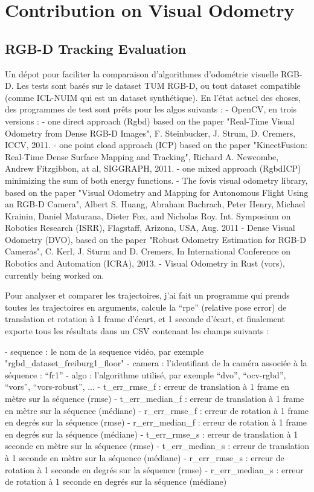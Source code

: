 \chapter{Contribution on Visual Odometry}%
\label{cha:vors}

\minitoc%

\section{RGB-D Tracking Evaluation}%
\label{sec:rgbd-tracking-evaluation}

Un dépot pour faciliter la comparaison d’algorithmes d’odométrie visuelle RGB-D. Les tests sont basés sur le dataset TUM RGB-D, ou tout dataset compatible (comme ICL-NUIM qui est un dataset synthétique). En l’état actuel des choses, des programmes de test sont prêts pour les algos suivants :
- OpenCV, en trois versions :
  - one direct approach (Rgbd) based on the paper "Real-Time Visual Odometry from Dense RGB-D Images", F. Steinbucker, J. Strum, D. Cremers, ICCV, 2011.
  - one point cload approach (ICP) based on the paper "KinectFusion: Real-Time Dense Surface Mapping and Tracking", Richard A. Newcombe, Andrew Fitzgibbon, at al, SIGGRAPH, 2011.
  - one mixed approach (RgbdICP) minimizing the sum of both energy functions.
- The fovis visual odometry library, based on the paper "Visual Odometry and Mapping for Autonomous Flight Using an RGB-D Camera", Albert S. Huang, Abraham Bachrach, Peter Henry, Michael Krainin, Daniel Maturana, Dieter Fox, and Nicholas Roy. Int. Symposium on Robotics Research (ISRR), Flagstaff, Arizona, USA, Aug. 2011
- Dense Visual Odometry (DVO), based on the paper "Robust Odometry Estimation for RGB-D Cameras", C. Kerl, J. Sturm and D. Cremers, In International Conference on Robotics and Automation (ICRA), 2013.
- Visual Odometry in Rust (vors), currently being worked on.

Pour analyser et comparer les trajectoires, j’ai fait un programme qui prends toutes les trajectoires en arguments, calcule la “rpe” (relative pose error) de translation et rotation à 1 frame d’écart, et 1 seconde d’écart, et finalement exporte tous les résultats dans un CSV contenant les champs suivants :

- sequence : le nom de la sequence vidéo, par exemple "rgbd\_dataset\_freiburg1\_floor"
- camera : l’identifiant de la caméra associée à la séquence : “fr1”
- algo : l’algorithme utilisé, par exemple “dvo”, “ocv-rgbd”, “vors”, “vors-robust”, ...
- t\_err\_rmse\_f : erreur de translation à 1 frame en mètre sur la séquence (rmse)
- t\_err\_median\_f : erreur de translation à 1 frame en mètre sur la séquence (médiane)
- r\_err\_rmse\_f : erreur de rotation à 1 frame en degrés sur la séquence (rmse)
- r\_err\_median\_f : erreur de rotation à 1 frame en degrés sur la séquence (médiane)
- t\_err\_rmse\_s : erreur de translation à 1 seconde en mètre sur la séquence (rmse)
- t\_err\_median\_s : erreur de translation à 1 seconde en mètre sur la séquence (médiane)
- r\_err\_rmse\_s : erreur de rotation à 1 seconde en degrés sur la séquence (rmse)
- r\_err\_median\_s : erreur de rotation à 1 seconde en degrés sur la séquence (médiane)

